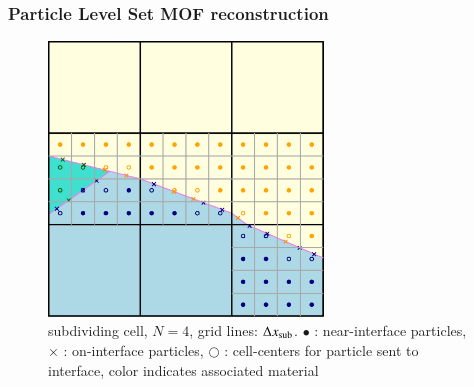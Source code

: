\documentclass[preprint,12pt]{Definitions/elsarticle}
\newcommand{\tn}{\textnormal}
\begin{document}
\subsubsection{Particle Level Set MOF reconstruction}
\begin{figure}[H]
	\centering
	\includegraphics[width=0.65\textwidth]{particleseeding_particles2.eps}
	\caption{subdividing cell, $N=4$, grid lines: $\Delta x_\tn{sub}$. $\bullet$ : near-interface particles, $\times$ : on-interface particles, $\bigcirc$ : cell-centers for particle sent to interface, color indicates associated material}
	\label{fig:particleseeding}
\end{figure}   
\end{document}
